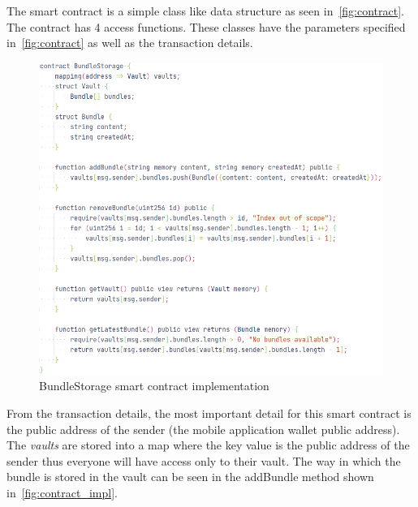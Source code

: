 \documentclass[a4paper,12pt]{report}
\begin{document}
The smart contract is a simple class like data structure as seen
in~\autoref{fig:contract}. The contract has 4 access functions. These classes
have the parameters specified in~\autoref{fig:contract} as well as the
transaction details.

\begin{figure}[H]
    \centering
    \includegraphics[scale=0.455]{images/code/contract.png}
    \caption{BundleStorage smart contract implementation}\label{fig:contract_impl}
\end{figure}

From the transaction details, the most important detail for this smart contract
is the public address of the sender (the mobile application wallet public
address). The \textit{vaults} are stored into a map where the key value is the
public address of the sender thus everyone will have access only to their
vault. The way in which the bundle is stored in the vault can be seen in the
addBundle method shown in~\autoref{fig:contract_impl}.
\end{document}

